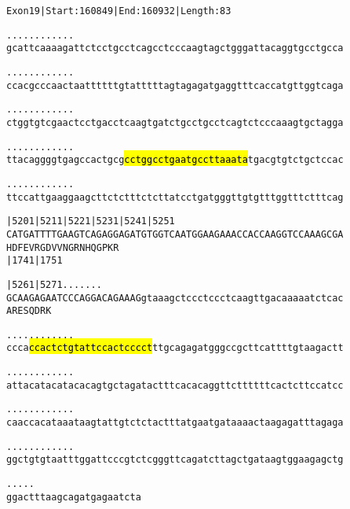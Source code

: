 \documentclass{article}
\begin{document}
\begin{alltt}
Exon 19 | Start: 160849 | End: 160932 | Length: 83

.    .    .    .    .    .    .    .    .    .    .    .    
gcattcaaaagattctcctgcctcagcctcccaagtagctgggattacaggtgcctgcca

.    .    .    .    .    .    .    .    .    .    .    .    
ccacgcccaactaattttttgtatttttagtagagatgaggtttcaccatgttggtcaga

.    .    .    .    .    .    .    .    .    .    .    .    
ctggtgtcgaactcctgacctcaagtgatctgcctgcctcagtctcccaaagtgctagga

.    .    .    .    .    .    .    .    .    .    .    .    
ttacaggggtgagccactgcg\hl{cctggcctgaatgccttaaata}tgacgtgtctgctccac

.    .    .    .    .    .    .    .    .    .    .    .    
ttccattgaaggaagcttctctttctcttatcctgatgggttgtgtttggtttctttcag

       |5201     |5211     |5221     |5231     |5241     |5251
CATGATTTTGAAGTCAGAGGAGATGTGGTCAATGGAAGAAACCACCAAGGTCCAAAGCGA
H  D  F  E  V  R  G  D  V  V  N  G  R  N  H  Q  G  P  K  R  
                           |1741                         |1751

       |5261     |5271      .    .    .    .    .    .    . 
GCAAGAGAATCCCAGGACAGAAAGgtaaagctccctccctcaagttgacaaaaatctcac
A  R  E  S  Q  D  R  K                                      

   .    .    .    .    .    .    .    .    .    .    .    . 
ccca\hl{ccactctgtattccactcccct}ttgcagagatgggccgcttcattttgtaagactt

   .    .    .    .    .    .    .    .    .    .    .    . 
attacatacatacacagtgctagatactttcacacaggttcttttttcactcttccatcc

   .    .    .    .    .    .    .    .    .    .    .    . 
caaccacataaataagtattgtctctactttatgaatgataaaactaagagatttagaga

   .    .    .    .    .    .    .    .    .    .    .    . 
ggctgtgtaatttggattcccgtctcgggttcagatcttagctgataagtggaagagctg

   .    .    .    .    .
ggactttaagcagatgagaatcta
\end{alltt}
\newpage
\end{document}
